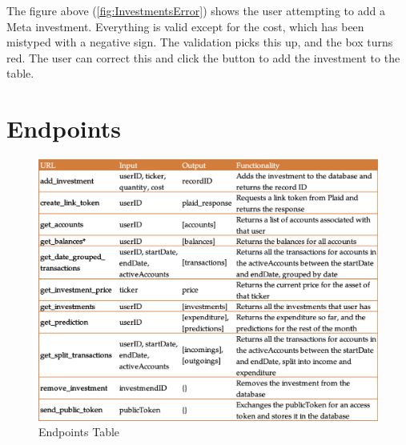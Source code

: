 The figure above (\ref{fig:InvestmentsError}) shows the user attempting to add a Meta investment. Everything is valid except for the cost, which has been mistyped with a negative sign. The validation picks this up, and the box turns red. The user can correct this and click the button to add the investment to the table.

\section{Endpoints}
\begin{figure}[H]
	\centering
	\includegraphics[width=\textwidth]{images/endpoints.png}
	\caption{Endpoints Table}
	\label{fig:Endpoints}
\end{figure}
